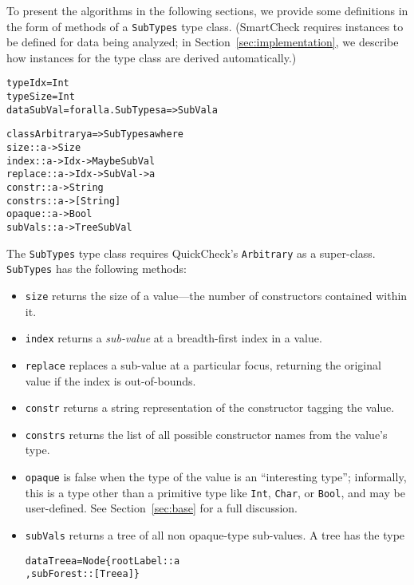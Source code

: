 \documentclass{sigplanconf}
\newenvironment{code}{\begin{alltt}\footnotesize}{\end{alltt}}
\newcommand{\ttp}[1]{\texttt{#1}}
\begin{document}
To present the algorithms in the following sections, we provide some definitions
in the form of methods of a \ttp{SubTypes} type class.  (SmartCheck requires
instances to be defined for data being analyzed; in
Section~\ref{sec:implementation}, we describe how instances for the type class
are derived automatically.)
%
\begin{code}
type Idx    = Int
type Size   = Int
data SubVal = forall a. SubTypes a => SubVal a

class Arbitrary a => SubTypes a where
  size    :: a -> Size
  index   :: a -> Idx -> Maybe SubVal
  replace :: a -> Idx -> SubVal -> a
  constr  :: a -> String
  constrs :: a -> [String]
  opaque  :: a -> Bool
  subVals :: a -> Tree SubVal
\end{code}
%
\noindent
The \ttp{SubTypes} type class requires QuickCheck's \ttp{Arbitrary} as a
super-class.  \ttp{SubTypes} has the following methods:
\begin{itemize}
\item \ttp{size} returns the size of a value---the number of
  constructors contained within it.
\item \ttp{index} returns a \emph{sub-value} at a breadth-first index in a
  value.
\item \ttp{replace} replaces a sub-value at a particular focus, returning the
  original value if the index is out-of-bounds.
\item \ttp{constr} returns a string representation of the constructor tagging
  the value.
\item \ttp{constrs} returns the list of all possible constructor names from the
  value's type.
\item \ttp{opaque} is false when the type of the value is an ``interesting
  type''; informally, this is a type other than a primitive type like \ttp{Int},
  \ttp{Char}, or \ttp{Bool}, and may be user-defined.  See
  Section~\ref{sec:base} for a full discussion.
\item \ttp{subVals} returns a tree of all non opaque-type sub-values.  A tree
  has the type
%
  \begin{code}
data Tree a = Node \{ rootLabel :: a
                   , subForest :: [Tree a] \}
  \end{code}
%
\end{itemize}
\end{document}
